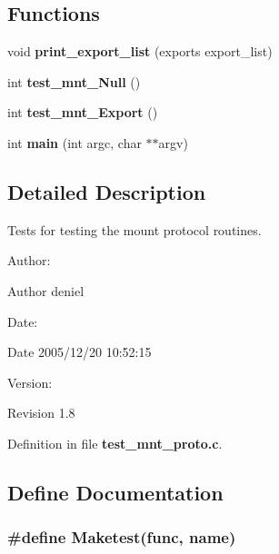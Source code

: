 \subsection*{Functions}
\begin{CompactItemize}
\item 
void {\bf print\_\-export\_\-list} (exports export\_\-list)
\item 
int {\bf test\_\-mnt\_\-Null} ()
\item 
int {\bf test\_\-mnt\_\-Export} ()
\item 
int {\bf main} (int argc, char $\ast$$\ast$argv)
\end{CompactItemize}


\subsection{Detailed Description}
Tests for testing the mount protocol routines. 

\begin{Desc}
\item[Author:]\begin{Desc}
\item[Author]deniel \end{Desc}
\end{Desc}
\begin{Desc}
\item[Date:]\begin{Desc}
\item[Date]2005/12/20 10:52:15 \end{Desc}
\end{Desc}
\begin{Desc}
\item[Version:]\begin{Desc}
\item[Revision]1.8 \end{Desc}
\end{Desc}


Definition in file {\bf test\_\-mnt\_\-proto.c}.

\subsection{Define Documentation}
\subsubsection{\setlength{\rightskip}{0pt plus 5cm}\#define Maketest(func, name)}\label{test__mnt__proto_8c_a1}


